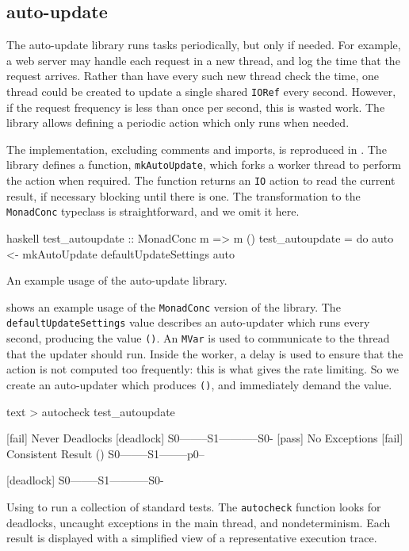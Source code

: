 \FloatBarrier

\subsection{auto-update}

The auto-update library \parencite{auto_update} runs tasks periodically, but
only if needed.  For example, a web server may handle each request in
a new thread, and log the time that the request arrives.  Rather than
have every such new thread check the time, one thread could be created
to update a single shared \verb|IORef| every second.  However, if the
request frequency is less than once per second, this is wasted work.
The library allows defining a periodic action which only runs when
needed.

The implementation, excluding comments and imports, is reproduced in
.  The library defines a function,
\verb|mkAutoUpdate|, which forks a worker thread to perform the action
when required.  The function returns an \verb|IO| action to read the
current result, if necessary blocking until there is one.  The
transformation to the \verb|MonadConc| typeclass is straightforward,
and we omit it here.

\begin{listing}
\centering
\begin{cminted}{haskell}
test_autoupdate :: MonadConc m => m ()
test_autoupdate = do
  auto <- mkAutoUpdate defaultUpdateSettings
  auto
\end{cminted}
\caption{An example usage of the auto-update library.}\label{lst:autoupdate_example1}
\end{listing}

 shows an example usage of the
\verb|MonadConc| version of the library.  The
\verb|defaultUpdateSettings| value describes an auto-updater which
runs every second, producing the value \verb|()|.  An \verb|MVar| is
used to communicate to the thread that the updater should run.  Inside
the worker, a delay is used to ensure that the action is not computed
too frequently: this is what gives the rate limiting.  So we create an
auto-updater which produces \verb|()|, and immediately demand the
value.

\begin{listing}
\centering
\begin{cminted}{text}
> autocheck test_autoupdate

[fail] Never Deadlocks
        [deadlock] S0--------S1-----------S0-
[pass] No Exceptions
[fail] Consistent Result
        () S0--------S1--------p0--

        [deadlock] S0--------S1-----------S0-
\end{cminted}
\caption[Using \dejafu{} to run a collection of standard tests.]{Using \dejafu{} to run a collection of standard tests.  The \texttt{autocheck} function looks for deadlocks, uncaught exceptions in the main thread, and nondeterminism.  Each result is displayed with a simplified view of a representative execution trace.}\label{lst:autoupdate_example2}
\end{listing}

